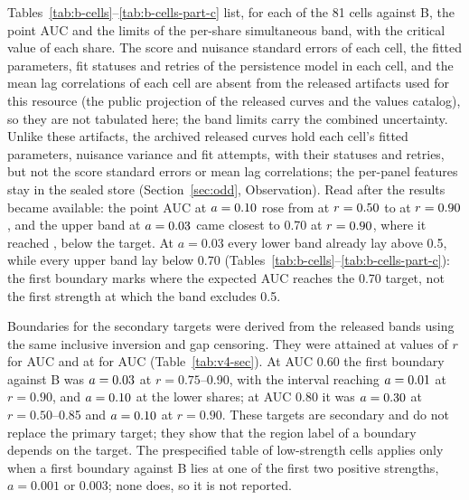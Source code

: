 Tables~\ref{tab:b-cells}--\ref{tab:b-cells-part-c} list, for each of the 81 cells against B, the point AUC and the limits of the per-share simultaneous band, with the critical value of each share.
The score and nuisance standard errors of each cell, the fitted parameters, fit statuses and retries of the persistence model in each cell, and the mean lag correlations of each cell are absent from the released artifacts used for this resource (the public projection of the released curves and the values catalog), so they are not tabulated here; the band limits carry the combined uncertainty. Unlike these artifacts, the archived released curves hold each cell's fitted parameters, nuisance variance and fit attempts, with their statuses and retries, but not the score standard errors or mean lag correlations; the per-panel features stay in the sealed store (Section~\ref{sec:odd}, Observation). Read after the results became available: the point AUC at $a=\resultnum{j.grid.a1000}{0.10}$ rose from  at $r=\resultnum{j.b.a1000.auc.min.r}{0.50}$ to  at $r=\resultnum{j.b.a1000.auc.max.r}{0.90}$, and the upper band at $a=\resultnum{j.grid.a0300}{0.03}$ came closest to 0.70 at $r=\resultnum{j.b.a0300.upper.max.r}{0.90}$, where it reached ,  below the target. At $a=0.03$ every lower band already lay above 0.5, while every upper band lay below 0.70 (Tables~\ref{tab:b-cells}--\ref{tab:b-cells-part-c}): the first boundary marks where the expected AUC reaches the 0.70 target, not the first strength at which the band excludes 0.5.

Boundaries for the secondary targets were derived from the released bands using the same inclusive inversion and gap censoring. They were attained at  values of $r$ for AUC  and at  for AUC  (Table~\ref{tab:v4-sec}). At AUC 0.60 the first boundary against B was $a=\resultnum{j.b.r075.target060.point}{0.03}$ at $r=0.75$--0.90, with the interval reaching $a=\resultnum{v4.tab.T1sec.B.r090.a060.2}{0.01}$ at $r=0.90$, and $a=\resultnum{j.b.r050.target060.point}{0.10}$ at the lower shares; at AUC 0.80 it was $a=\resultnum{j.b.r050.target080.point}{0.30}$ at $r=0.50$--0.85 and $a=\resultnum{j.b.r090.target080.point}{0.10}$ at $r=0.90$. These targets are secondary and do not replace the primary target; they show that the region label of a boundary depends on the target.
The prespecified table of low-strength cells applies only when a first boundary against B lies at one of the first two positive strengths, $a=0.001$ or 0.003; none does, so it is not reported.

